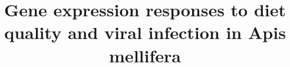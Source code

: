 \documentclass{bmcart}
\begin{document}
\begin{frontmatter}

\begin{fmbox}

\title{Gene expression responses to diet quality and viral infection in Apis mellifera}


\author[
   addressref={aff1},                   %
   email={lrutter@iastate.edu}   %
]{ }
\author[
   addressref={aff2},
   email={dicook@monash.edu}
]{ }
\author[
   addressref={aff3,aff4},
   email={amytoth@iastate.edu}
]{ }
\author[
   addressref={aff5},
   corref={aff5},
   email={adolezal@illinois.edu}
]{ }

\address[id=aff1]{%
  ,
  ,   
  ,
}
\address[id=aff2]{%
  ,
  ,   
  ,
}

\address[id=aff3]{%
  ,
  ,   
  ,
}

\address[id=aff4]{%
  ,
  ,   
  ,
}


\end{fmbox}
\end{frontmatter}
\end{document}
